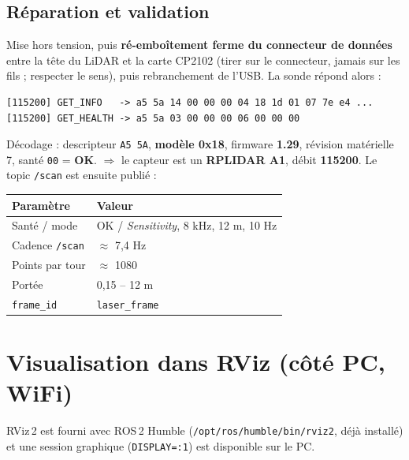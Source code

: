 \documentclass[a4paper,11pt]{article}
\begin{document}
\subsection{Réparation et validation}
Mise hors tension, puis \textbf{ré-emboîtement ferme du connecteur de données}
entre la tête du LiDAR et la carte CP2102 (tirer sur le connecteur, jamais sur les
fils ; respecter le sens), puis rebranchement de l'USB. La sonde répond alors :
\begin{lstlisting}
[115200] GET_INFO   -> a5 5a 14 00 00 00 04 18 1d 01 07 7e e4 ...
[115200] GET_HEALTH -> a5 5a 03 00 00 00 06 00 00 00
\end{lstlisting}
Décodage : descripteur \texttt{A5 5A}, \textbf{modèle 0x18}, firmware
\textbf{1.29}, révision matérielle 7, santé \texttt{00} = \textbf{OK}.
$\Rightarrow$ le capteur est un \textbf{RPLIDAR A1}, débit \textbf{115200}. Le
topic \texttt{/scan} est ensuite publié :
\begin{center}
\begin{tabular}{@{}ll@{}}
\toprule
Paramètre & Valeur \\
\midrule
Santé / mode      & OK / \emph{Sensitivity}, 8 kHz, 12 m, 10 Hz \\
Cadence \texttt{/scan} & $\approx$ 7,4 Hz \\
Points par tour   & $\approx$ 1080 \\
Portée            & 0,15 -- 12 m \\
\texttt{frame\_id} & \texttt{laser\_frame} \\
\bottomrule
\end{tabular}
\end{center}

\section{Visualisation dans RViz (côté PC, WiFi)}
RViz\,2 est fourni avec ROS\,2 Humble (\texttt{/opt/ros/humble/bin/rviz2}, déjà
installé) et une session graphique (\texttt{DISPLAY=:1}) est disponible sur le PC.
\end{document}
